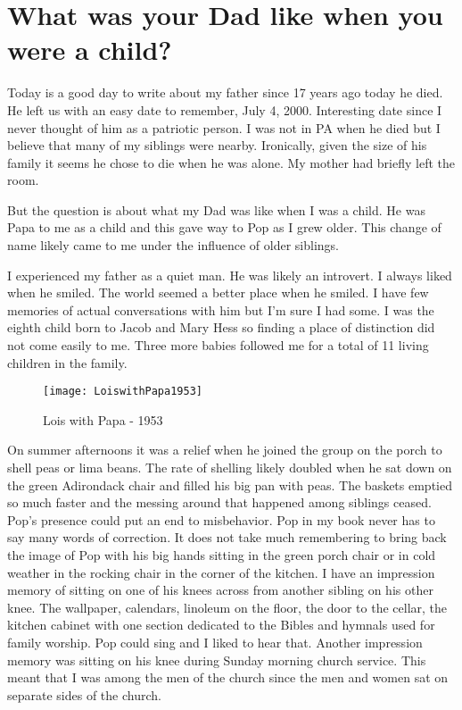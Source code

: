 \section{What was your Dad like when you were a child?}

Today is a good day to write about my father since 17 years ago today he died.
He left us with an easy date to remember, July 4, 2000.
Interesting date since I never thought of him as a patriotic person.
I was not in PA when he died but I believe that many of my siblings were nearby.
Ironically, given the size of his family it seems he chose to die when he was alone.
My mother had briefly left the room.

But the question is about what my Dad was like when I was a child.
He was Papa to me as a child and this gave way to Pop as I grew older.
This change of name likely came to me under the influence of older siblings.

I experienced my father as a quiet man.
He was likely an introvert.
I always liked when he smiled.
The world seemed a better place when he smiled.
I have few memories of actual conversations with him but I'm sure I had some.
I was the eighth child born to Jacob and Mary Hess so finding a place of distinction did not come easily to me.
Three more babies followed me for a total of 11 living children in the family.
\begin{wrapfigure}{R}{0.6\textwidth}
\centering
\texttt{[image: LoiswithPapa1953]}
\caption{Lois with Papa - 1953}
\end{wrapfigure}

On summer afternoons it was a relief when he joined the group on the porch to shell peas or lima beans.
The rate of shelling likely doubled when he sat down on the green Adirondack chair and filled his big pan with peas.
The baskets emptied so much faster and the messing around that happened among siblings ceased.
Pop's presence could put an end to misbehavior.
Pop in my book never has to say many words of correction.
It does not take much remembering to bring back the image of Pop with his big hands sitting in the green porch chair or in cold weather in the rocking chair in the corner of the kitchen.
I have an impression memory of sitting on one of his knees across from another sibling on his other knee.
The wallpaper, calendars, linoleum on the floor, the door to the cellar, the kitchen cabinet with one section dedicated to the Bibles and hymnals used for family worship.
Pop could sing and I liked to hear that.
Another impression memory was sitting on his knee during Sunday morning church service.
This meant that I was among the men of the church since the men and women sat on separate sides of the church.

